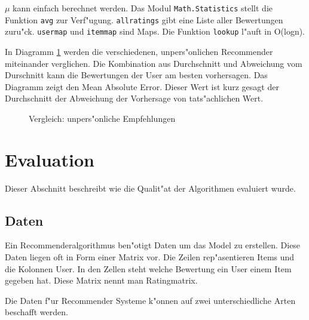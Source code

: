 \documentclass[a4paper, 12pt]{article}
\begin{document}
$\mu$ kann einfach berechnet werden. Das Modul \verb|Math.Statistics| stellt die Funktion \verb|avg| zur Verf"ugung. \verb|allratings| gibt eine Liste aller Bewertungen zuru"ck. \verb|usermap| und \verb|itemmap| sind Maps. Die Funktion \verb|lookup| l"auft in O(logn).

In Diagramm \ref{fig:maebaselines} werden die verschiedenen, unpers"onlichen Recommender miteinander verglichen. Die Kombination aus Durchschnitt und Abweichung vom Durschnitt kann die Bewertungen der User am besten vorhersagen. Das Diagramm zeigt den Mean Absolute Error. Dieser Wert ist kurz gesagt der Durchschnitt der Abweichung der Vorhersage von tats"achlichen Wert.

\begin{figure}
  \centering
{}
  
  \caption{Vergleich: unpers"onliche Empfehlungen}
  \label{fig:maebaselines}
\end{figure}

\section{Evaluation}
\label{sec:evaluation}

Dieser Abschnitt beschreibt wie die Qualit"at der Algorithmen evaluiert wurde.

\subsection{Daten}
\label{sec:data}

Ein Recommenderalgorithmus ben"otigt Daten um das Model zu erstellen. Diese Daten liegen oft in Form einer Matrix vor. Die Zeilen rep"asentieren Items und die Kolonnen User. In den Zellen steht welche Bewertung ein User einem Item gegeben hat. Diese Matrix nennt man Ratingmatrix.

Die Daten f"ur Recommender Systeme k"onnen auf zwei unterschiedliche Arten beschafft werden.
\end{document}
